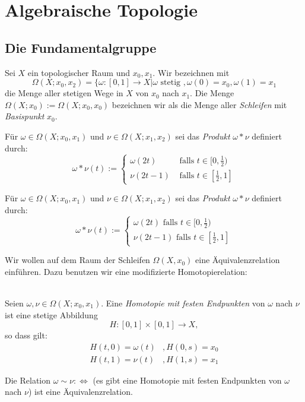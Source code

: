 \documentclass[a4paper,10pt]{scrartcl}
\begin{document}
\section{Algebraische Topologie}
\subsection{Die Fundamentalgruppe}
\begin{df}
 Sei $X$ ein topologischer Raum und $x_0, x_1$. Wir bezeichnen mit
\[
 \Omega(X; x_0,x_2)=\{\omega: [0,1]\to X|\omega \text{ stetig }, \omega(0)=x_0, \omega(1)=x_1
\]
die Menge aller stetigen Wege in $X$ von $x_0$ nach $x_1$. \fixme[fig48]
Die Menge $\Omega(X; x_0):=\Omega(X; x_0, x_0)$ bezeichnen wir als die Menge aller \emph{Schleifen} mit \emph{Basispunkt} $x_0$.
\end{df}
\begin{df} Für $\omega\in \Omega(X; x_0, x_1)$ und $\nu\in \Omega(X; x_1, x_2)$ sei das \emph{Produkt} $\omega*\nu$ definiert durch:
 \[
  \omega*\nu(t):=\begin{cases} \omega(2t) &\text{ falls } t\in[0,\frac{1}{2})\\ \nu(2t-1) &\text{ falls } t\in[\frac{1}{2}, 1] \end{cases}
 \]
\fixme[fig49]
\end{df}
\begin{df}
 Für $\omega \in \Omega(X; x_0, x_1)$ und $\nu\in \Omega(X; x_1, x_2)$ sei das \emph{Produkt} $\omega * \nu$ definiert durch:
\[
 \omega * \nu (t):= \begin{cases} \omega(2t) \text{ falls } t\in[0, \frac{1}{2})\\ \nu(2t-1) \text{ falls } t\in[\frac{1}{2},1] \end{cases}
\]
\end{df}
Wir wollen auf dem Raum der Schleifen $\Omega(X, x_0)$ eine Äquivalenzrelation einführen. Dazu benutzen wir eine modifizierte Homotopierelation:
\begin{df}
\fixme[fig50]\\
 Seien $\omega, \nu \in \Omega(X; x_0, x_1)$. Eine \emph{Homotopie mit festen Endpunkten} von $\omega$ nach $\nu$ ist eine stetige Abbildung
\[
 H: [0,1]\times [0,1] \to X,
\]
so dass gilt: 
\begin{align*}
 H(t,0)=\omega(t)&, H(0,s)=x_0\\
 H(t,1)=\nu(t)&, H(1,s)=x_1
\end{align*}
\end{df}
\begin{lem} \label{thm2:1.5}
 Die Relation $\omega\sim \nu:\iff$ (es gibt eine Homotopie mit festen Endpunkten von $\omega$ nach $\nu$) ist eine Äquivalenzrelation.
\end{lem}
\end{document}
